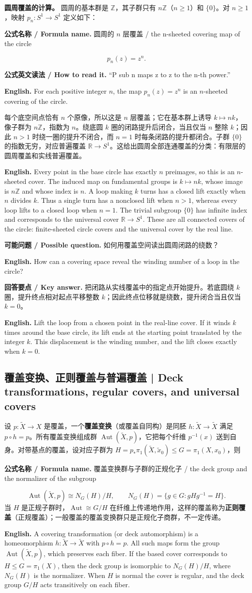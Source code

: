 \documentclass[UTF8,11pt,a4paper]{ctexart}
\newcommand{\EN}[1]{\par\noindent\textbf{English.} #1\par}
\newcommand{\READ}[1]{\par\noindent\textbf{公式英文读法 / How to read it.} #1\par}
\newcommand{\FORMULA}[2]{\par\noindent\textbf{公式名称 / Formula name.} #1 / #2\par}
\newcommand{\ASK}[4]{\par\noindent\textbf{可能问题 / Possible question.} #1\par\EN{#2}\noindent\textbf{回答要点 / Key answer.} #3\par\EN{#4}\medskip}
\begin{document}
\noindent\textbf{圆周覆盖的计算。} 圆周的基本群是 $\mathbb Z$，其子群只有 $n\mathbb Z$（$n\ge1$）和 $\{0\}$。对 $n\ge1$，映射 $p_n:S^1\to S^1$ 定义如下：
\FORMULA{圆周的 $n$ 层覆盖}{the n-sheeted covering map of the circle}
\[
p_n(z)=z^n.
\]
\READ{“P sub n maps z to z to the n-th power.”}
\EN{For each positive integer $n$, the map $p_n(z)=z^n$ is an $n$-sheeted covering of the circle.}
\noindent 每个底空间点恰有 $n$ 个原像，所以这是 $n$ 层覆盖；它在基本群上诱导 $k\mapsto nk$，像子群为 $n\mathbb Z$，指数为 $n$。绕底圆 $k$ 圈的闭路提升后闭合，当且仅当 $n$ 整除 $k$；因此 $n>1$ 时绕一圈的提升不闭合，而 $n=1$ 时每条闭路的提升都闭合。子群 $\{0\}$ 的指数无穷，对应普遍覆盖 $\mathbb R\to S^1$。这给出圆周全部连通覆盖的分类：有限层的圆周覆盖和实线普遍覆盖。
\EN{Every point in the base circle has exactly $n$ preimages, so this is an $n$-sheeted cover. The induced map on fundamental groups is $k\mapsto nk$, whose image is $n\mathbb Z$ and whose index is $n$. A loop making $k$ turns has a closed lift exactly when $n$ divides $k$. Thus a single turn has a nonclosed lift when $n>1$, whereas every loop lifts to a closed loop when $n=1$. The trivial subgroup $\{0\}$ has infinite index and corresponds to the universal cover $\mathbb R\to S^1$. These are all connected covers of the circle: finite-sheeted circle covers and the universal cover by the real line.}
\ASK{如何用覆盖空间读出圆周闭路的绕数？}{How can a covering space reveal the winding number of a loop in the circle?}{把闭路从实线覆盖中的指定点开始提升。若底圆绕 $k$ 圈，提升终点相对起点平移整数 $k$；因此终点位移就是绕数，提升闭合当且仅当 $k=0$。}{Lift the loop from a chosen point in the real-line cover. If it winds $k$ times around the base circle, its lift ends at the starting point translated by the integer $k$. This displacement is the winding number, and the lift closes exactly when $k=0$.}

\subsection{覆盖变换、正则覆盖与普遍覆盖 | Deck transformations, regular covers, and universal covers}
\noindent 设 $p:\widetilde X\to X$ 是覆盖，一个\textbf{覆盖变换}（或覆盖自同构）是同胚 $h:\widetilde X\to\widetilde X$ 满足 $p\circ h=p$。所有覆盖变换组成群 $\operatorname{Aut}(\widetilde X,p)$，它把每个纤维 $p^{-1}(x)$ 送到自身。对带基点的覆盖，设对应子群为 $H=p_*\pi_1(\widetilde X,\widetilde x_0)\le G=\pi_1(X,x_0)$，则
\FORMULA{覆盖变换群与子群的正规化子}{the deck group and the normalizer of the subgroup}
\[
\operatorname{Aut}(\widetilde X,p)\cong N_G(H)/H,
\qquad N_G(H)=\{g\in G:gHg^{-1}=H\}.
\]
当 $H$ 是正规子群时，$\operatorname{Aut}\cong G/H$ 在纤维上传递地作用，这样的覆盖称为\textbf{正则覆盖}（正规覆盖）；一般覆盖的覆盖变换群只是正规化子商群，不一定传递。
\EN{A covering transformation (or deck automorphism) is a homeomorphism $h:\widetilde X\to\widetilde X$ with $p\circ h=p$. All such maps form the group $\operatorname{Aut}(\widetilde X,p)$, which preserves each fiber. If the based cover corresponds to $H\le G=\pi_1(X)$, then the deck group is isomorphic to $N_G(H)/H$, where $N_G(H)$ is the normalizer. When $H$ is normal the cover is regular, and the deck group $G/H$ acts transitively on each fiber.}
\end{document}
